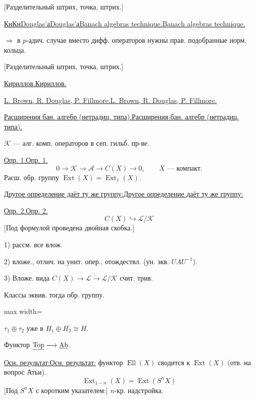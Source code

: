 \documentclass[11pt]{article}
\theoremstyle{definition}
\theoremstyle{remark}
\let\DiplomaticMathUnderline\underline
\renewcommand{\underline}[1]{\ifmmode\DiplomaticMathUnderline{#1}\else\uline{#1}\fi}
\begin{document}
[Разделительный штрих, точка, штрих.]

\underline{Кн}\quad\underline{Douglas'а}\quad\underline{Banach algebras technique.}

$\Rightarrow$ в $p$-адич. случае вместо дифф. операторов нужны прав. подобранные
норм. кольца.

[Разделительный штрих, точка, штрих.]

\underline{Кириллов.}

\underline{L. Brown, R. Douglas, P. Fillmore.}

\underline{Расширения бан. алгебр (нетрадиц. типа).}

$\mathcal K$ — алг. комп. операторов в сеп. гильб. пр-ве.

\underline{Опр. 1.}
\begin{equation*}
0\to\mathcal K\to\mathcal A\to C(X)\to0,
\qquad X\text{ — компакт.}
\end{equation*}
Расш. обр. группу $\operatorname{Ext}(X)=\operatorname{Ext}_1(X)$.

\underline{Другое определение даёт ту же группу:}

\underline{Опр. 2.}
\begin{equation*}
C(X)\hookrightarrow\mathcal L/\mathcal K
\end{equation*}
[Под формулой проведена двойная скобка.]

1) рассм. все влож.

2) вложе., отлич. на унит. опер., отождествл.
(ун. экв. $UAU^{-1}$).

3) Вложе. вида $C(X)\to\mathcal L\to\mathcal L/\mathcal K$ счит. трив.

Классы эквив. тогда обр. группу.

\begin{center}
\begin{adjustbox}{max width=\linewidth}
\end{adjustbox}
\end{center}
$\tau_1\oplus\tau_2$ уже в $H_1\oplus H_2\cong H$.

Функтор $\underline{\mathrm{Top}}\longrightarrow\underline{\mathrm{Ab}}$.

\underline{Осн. результат:} функтор $\operatorname{Ell}(X)$ сводится к
$\operatorname{Ext}(X)$ (отв. на вопрос Атьи).
\begin{equation*}
\operatorname{Ext}_{1-n}(X)=\operatorname{Ext}(S^nX)
\end{equation*}
[Под $S^nX$ с коротким указателем:] $n$-кр. надстройка.
\end{document}
